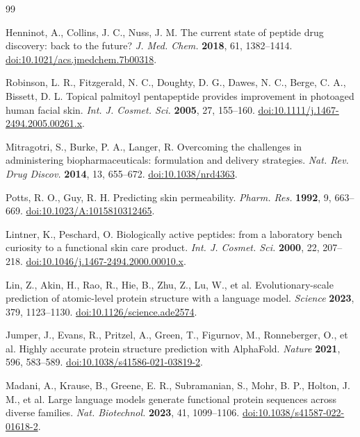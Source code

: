 \documentclass[11pt,letterpaper]{article}
\begin{document}
\begin{thebibliography}{99}

 Henninot, A., Collins, J. C., Nuss, J. M. The current state of peptide drug discovery: back to the future? \textit{J. Med. Chem.} \textbf{2018}, 61, 1382--1414. \href{https://doi.org/10.1021/acs.jmedchem.7b00318}{doi:10.1021/acs.jmedchem.7b00318}.

 Robinson, L. R., Fitzgerald, N. C., Doughty, D. G., Dawes, N. C., Berge, C. A., Bissett, D. L. Topical palmitoyl pentapeptide provides improvement in photoaged human facial skin. \textit{Int. J. Cosmet. Sci.} \textbf{2005}, 27, 155--160. \href{https://doi.org/10.1111/j.1467-2494.2005.00261.x}{doi:10.1111/j.1467-2494.2005.00261.x}.

 Mitragotri, S., Burke, P. A., Langer, R. Overcoming the challenges in administering biopharmaceuticals: formulation and delivery strategies. \textit{Nat. Rev. Drug Discov.} \textbf{2014}, 13, 655--672. \href{https://doi.org/10.1038/nrd4363}{doi:10.1038/nrd4363}.

 Potts, R. O., Guy, R. H. Predicting skin permeability. \textit{Pharm. Res.} \textbf{1992}, 9, 663--669. \href{https://doi.org/10.1023/A:1015810312465}{doi:10.1023/A:1015810312465}.

 Lintner, K., Peschard, O. Biologically active peptides: from a laboratory bench curiosity to a functional skin care product. \textit{Int. J. Cosmet. Sci.} \textbf{2000}, 22, 207--218. \href{https://doi.org/10.1046/j.1467-2494.2000.00010.x}{doi:10.1046/j.1467-2494.2000.00010.x}.

 Lin, Z., Akin, H., Rao, R., Hie, B., Zhu, Z., Lu, W., et al. Evolutionary-scale prediction of atomic-level protein structure with a language model. \textit{Science} \textbf{2023}, 379, 1123--1130. \href{https://doi.org/10.1126/science.ade2574}{doi:10.1126/science.ade2574}.

 Jumper, J., Evans, R., Pritzel, A., Green, T., Figurnov, M., Ronneberger, O., et al. Highly accurate protein structure prediction with AlphaFold. \textit{Nature} \textbf{2021}, 596, 583--589. \href{https://doi.org/10.1038/s41586-021-03819-2}{doi:10.1038/s41586-021-03819-2}.

 Madani, A., Krause, B., Greene, E. R., Subramanian, S., Mohr, B. P., Holton, J. M., et al. Large language models generate functional protein sequences across diverse families. \textit{Nat. Biotechnol.} \textbf{2023}, 41, 1099--1106. \href{https://doi.org/10.1038/s41587-022-01618-2}{doi:10.1038/s41587-022-01618-2}.


\end{thebibliography}
\end{document}
